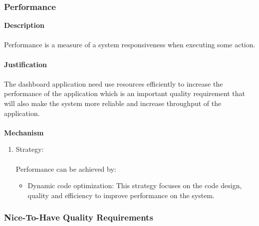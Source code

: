 \documentclass[hidelinks, 12pt, oneside]{article}
\begin{document}
			\subsubsection*{Performance}
			\textbf{Description}\\\\
			Performance is a measure of a system responsiveness when executing some action.\\\\
			\textbf{Justification}\\\\
			The dashboard application need use resources efficiently to increase the performance of the application which is an important quality requirement that will also make the system more reliable and increase throughput of the application.\\\\
			\textbf{Mechanism}
			\begin{enumerate}
				\item Strategy:\\\\
				Performance can be achieved by:
				\begin{itemize}
				\item Dynamic code optimization: This strategy focuses on the code design, quality and efficiency to improve performance on the system.  
				\end{itemize}
			\end{enumerate}	
			
		\newpage
		\subsubsection{Nice-To-Have Quality Requirements}
\end{document}
